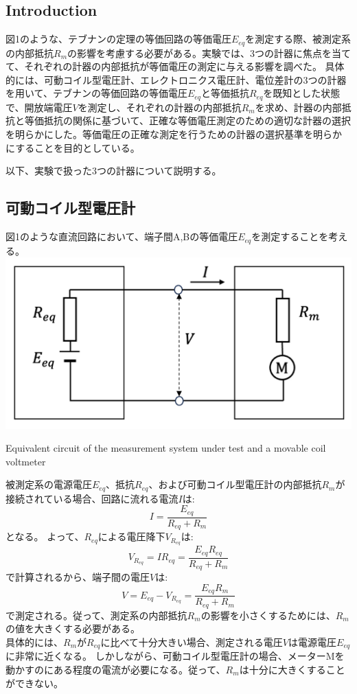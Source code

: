 \documentclass[a4paper,10pt]{jsarticle}
\makeatletter
\newenvironment{figurehere}
{\def\@captype{figure}}
{}
\makeatother
\begin{document}
\begin{multicols}{2}
\section{Introduction}
図1のような、テブナンの定理の等価回路の等価電圧$E_{eq}$を測定する際、被測定系の内部抵抗$R_m$の影響を考慮する必要がある。実験では、3つの計器に焦点を当てて、それぞれの計器の内部抵抗が等価電圧の測定に与える影響を調べた。
具体的には、可動コイル型電圧計、エレクトロニクス電圧計、電位差計の3つの計器を用いて、テブナンの等価回路の等価電圧$E_{eq}$と等価抵抗$R_{eq}$を既知とした状態で、開放端電圧$V$を測定し、それぞれの計器の内部抵抗$R_m$を求め、計器の内部抵抗と等価抵抗の関係に基づいて、正確な等価電圧測定のための適切な計器の選択を明らかにした。等価電圧の正確な測定を行うための計器の選択基準を明らかにすることを目的としている。

以下、実験で扱った3つの計器について説明する。
\subsection{可動コイル型電圧計}
図1のような直流回路において、端子間A,Bの等価電圧$E_{eq}$を測定することを考える。\\

\begin{figurehere}
  \centering
  \includegraphics[width=0.8\linewidth]{figs/Equivalent_circuit_of_moving-coil_VM.pdf}
  \caption{Equivalent circuit of the measurement system under test and a movable coil voltmeter}
  \label{fig:equivalent_circuit}
\end{figurehere}

被測定系の電源電圧$E_{eq}$、抵抗$R_{eq}$、および可動コイル型電圧計の内部抵抗$R_m$が接続されている場合、回路に流れる電流$I$は:
\begin{equation}
I=\frac{E_{eq}}{R_{eq}+R_m}
\end{equation}
となる。
よって、$R_{eq}$による電圧降下$V_{R_{eq}}$は:
\begin{equation}
V_{R_{eq}}=IR_{eq}=\frac{E_{eq}R_{eq}}{R_{eq}+R_m}
\end{equation}
で計算されるから、端子間の電圧$V$は:
\begin{equation}
V=E_{eq}-V_{R_{eq}}=\frac{E_{eq}R_m}{R_{eq}+R_m}
\end{equation}
で測定される。従って、測定系の内部抵抗$R_m$の影響を小さくするためには、$R_m$の値を大きくする必要がある。\\
具体的には、$R_m$が$R_{eq}$に比べて十分大きい場合、測定される電圧$V$は電源電圧$E_{eq}$に非常に近くなる。
しかしながら、可動コイル型電圧計の場合、メーターMを動かすのにある程度の電流が必要になる。従って、$R_m$は十分に大きくすることができない。

\end{multicols}
\end{document}
